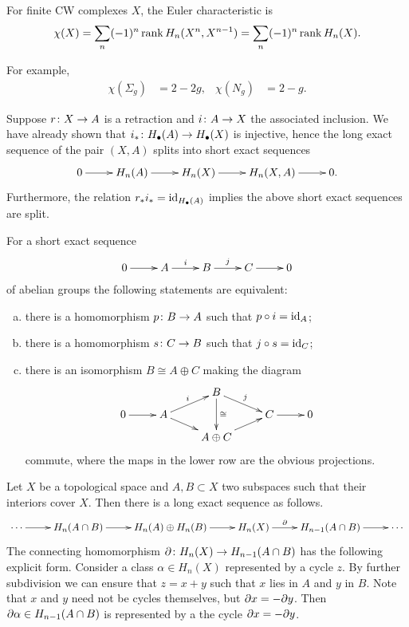 \begin{theorem}
  For finite CW complexes $X$, the Euler characteristic is
  \[
  \chi(X) = \sum_n (-1)^n \operatorname{rank} H_n(X^n, X^{n-1}) = \sum_n (-1)^n \operatorname{rank} H_n(X).
  \]
\end{theorem}

For example,
\begin{align*}
  \chi(\Sigma_g) &= 2 - 2 g, &
  \chi(N_g) &= 2 - g.
\end{align*}

Suppose $r \colon X \rightarrow A$ is a retraction and $i \colon A \rightarrow X$ the associated inclusion. We have already shown that $i_\ast \colon H_\bullet(A) \rightarrow H_\bullet(X)$ is injective, hence the long exact sequence of the pair $(X,A)$ splits into short exact sequences
\[\xymatrix{
  0 \ar[r] & H_n(A) \ar[r] & H_n(X) \ar[r] & H_n(X,A) \ar[r] & 0.
}\]
Furthermore, the relation $r_\ast i_\ast = \operatorname{id}_{H_\bullet(A)}$ implies the above short exact sequences are split.

\begin{proposition}
  For a short exact sequence
  \[\xymatrix{
    0 \ar[r] & A \ar[r]^-i & B \ar[r]^-j & C \ar[r] & 0
  }\]
  of abelian groups the following statements are equivalent:
  \begin{enumerate}[(a)]
  \item there is a homomorphism $p \colon B \rightarrow A$ such that $p \circ i = \operatorname{id}_A$;
  \item there is a homomorphism $s \colon C \rightarrow B$ such that $j \circ s = \operatorname{id}_C$;
  \item there is an isomorphism $B \cong A \oplus C$ making the diagram
    \[\xymatrix@R=0.1in{
      && B \ar[dr]^-j \ar[dd]^-\cong \\
      0 \ar[r] & A \ar[ur]^-i \ar[dr] && C \ar[r] & 0 \\
      && A \oplus C \ar[ur]
    }\]
    commute, where the maps in the lower row are the obvious projections.
  \end{enumerate}
\end{proposition}

\begin{theorem}
  Let $X$ be a topological space and $A, B \subset X$ two subspaces such that their interiors cover $X$. Then there is a long exact sequence as follows.
  \[\xymatrix{
    \cdots \ar[r] & H_n(A \cap B) \ar[r] & H_n(A) \oplus H_n(B) \ar[r] & H_n(X) \ar[r]^-\d & H_{n-1}(A \cap B) \ar[r] & \cdots 
  }\]
  The connecting homomorphism $\partial \colon H_n(X) \rightarrow H_{n-1}(A \cap B)$ has the following explicit form. Consider a class $\alpha \in H_n(X)$ represented by a cycle $z$. By further subdivision we can ensure that $z = x + y$ such that $x$ lies in $A$ and $y$ in $B$. Note that $x$ and $y$ need not be cycles themselves, but $\partial x = -\partial y$. Then $\partial \alpha \in H_{n-1}(A \cap B)$ is represented by a the cycle $\partial x = -\partial y$.
\end{theorem}

